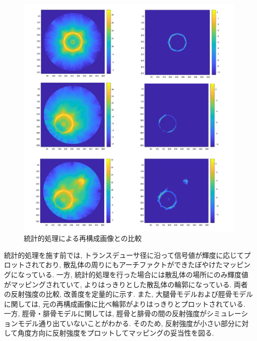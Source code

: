 \begin{figure}[H]
  \begin{center}
    \includegraphics[width=140mm]{fig/gassanhikaku.pdf}
  \end{center}
  \caption{統計的処理による再構成画像との比較}
\end{figure}
統計的処理を施す前では, トランスデューサ径に沿って信号値が輝度に応じてプロットされており, 散乱体の周りにもアーチファクトができたぼやけたマッピングになっている. 一方, 統計的処理を行った場合には散乱体の場所にのみ輝度値がマッピングされていて, よりはっきりとした散乱体の輪郭になっている. 両者の反射強度の比較, 改善度を定量的に示す. また, 大腿骨モデルおよび脛骨モデルに関しては, 元の再構成画像に比べ輪郭がよりはっきりとプロットされている. 一方, 脛骨・腓骨モデルに関しては, 脛骨と腓骨の間の反射強度がシミュレーションモデル通り出ていないことがわかる. そのため, 反射強度が小さい部分に対して角度方向に反射強度をプロットしてマッピングの妥当性を図る. 